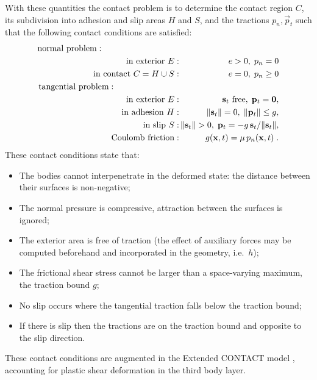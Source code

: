 \documentclass[12pt]{report}
\begin{document}
With these quantities the contact problem is to determine the contact
region $C$, its subdivision into adhesion and slip areas $H$ and $S$, and the
tractions $p_n, \vec{p}_t$ such that the following contact conditions are
satisfied:
\begin{eqnarray}
\mbox{normal problem} : \hspace{32mm} &&     \nonumber\\
  \mbox{in exterior $E$} :      && \hspace{-3mm} e > 0, \; p_n = 0
                                                \label{eq:norm_ext} \\
  \mbox{in contact $C=H\cup S$} : && \hspace{-3mm} e = 0, \; p_n \ge 0
                                                \label{eq:norm_int} \\
\mbox{tangential problem} : \hspace{27mm} && \nonumber\\
  \mbox{in exterior $E$} :      && \hspace{-3mm}
           \vec{s}_t \mbox{ free}, \; \vec{p}_t = \vec{0},
                                                \label{eq:tang_ext} \\
  \mbox{in adhesion $H$} :      && \hspace{-3mm}
           \|\vec{s}_t\| = 0, \; \|\vec{p}_t\| \le g,
                                                \label{eq:tang_adhes} \\
  \mbox{in slip $S$} :          && \hspace{-3mm}
           \|\vec{s}_t\| > 0, \; \vec{p}_t =
                                -g \,\vec{s}_t/\|\vec{s}_t\|,
                                                \label{eq:tang_slip} \\
  \mbox{Coulomb friction} :   && \hspace{-3mm}
     g(\vec{x},t) = \mu \, p_n(\vec{x},t) \; .\label{eq:tract_bound}
\end{eqnarray}
These contact conditions state that:
\begin{itemize}
\item The bodies cannot interpenetrate in the deformed state: the distance
        between their surfaces is non-negative;
\item The normal pressure is compressive, attraction between the surfaces
        is ignored;
\item The exterior area is free of traction (the effect of auxiliary forces
        may be computed beforehand and incorporated in the geometry, i.e.\
        $h$);
\item The frictional shear stress cannot be larger than a space-varying
        maximum, the traction bound $g$;
\item No slip occurs where the tangential traction falls below the traction
        bound;
\item If there is slip then the tractions are on the traction bound and
        opposite to the slip direction.
\end{itemize}
These contact conditions are augmented in the Extended CONTACT model
\cite{Vollebregt2026a-tractcurv,Vollebregt2024a-vor-fra}, accounting for
plastic shear deformation in the third body layer.
\end{document}
